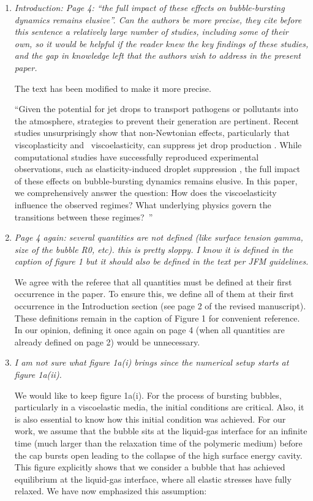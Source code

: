 \documentclass[]{article}
\newcommand{\oo}{\color{magenta} \normalfont}
\newcommand{\bb}{\color{black} \normalfont}
\begin{document}
\begin{enumerate}
      \item \textit{Introduction: Page 4: “the full impact of these effects on bubble-bursting dynamics remains elusive”. Can the authors be more precise, they cite before this sentence a relatively large number of studies, including some of their own, so it would be helpful if the reader knew the key findings of these studies, and the gap in knowledge left that the authors wish to address in the present paper.}

      The text has been modified to make it more precise.

	``Given the potential for jet drops to transport pathogens or pollutants into the atmosphere, strategies to prevent their generation are pertinent. Recent studies unsurprisingly show that non-Newtonian effects, particularly that \oo viscoplasticity and\bb\, viscoelasticity, can suppress jet drop production \citep{sanjay2021bursting, sen2021retraction, rodriguez2023bubble, ji2023secondary}.
	While computational studies have successfully reproduced experimental observations, such as elasticity-induced droplet suppression \citep{cabalganteeffect, ari2024bursting}, the full impact of these effects on bubble-bursting dynamics remains elusive. \oo In this paper, we comprehensively answer the question: How does the viscoelasticity influence the observed regimes? What underlying physics govern the transitions between these regimes?\bb\,''

      \item \textit{Page 4 again: several quantities are not defined (like surface tension gamma, size of the bubble R0, etc). this is pretty sloppy. I know it is defined in the caption of figure 1 but it should also be defined in the text per JFM guidelines.}

      We agree with the referee that all quantities must be defined at their first occurrence in the paper. To ensure this, we define all of them at their first occurrence in the Introduction section (see page 2 of the revised manuscript). These definitions remain in the caption of Figure 1 for convenient reference. In our opinion, defining it once again on page 4 (when all quantities are already defined on page 2) would be unnecessary.

      \item \textit{I am not sure what figure 1a(i) brings since the numerical setup starts at figure 1a(ii).}

      We would like to keep figure 1a(i). For the process of bursting bubbles, particularly in a viscoelastic media, the initial conditions are critical. Also, it is also essential to know how this initial condition was achieved. For our work, we assume that the bubble sits at the liquid-gas interface for an infinite time (much larger than the relaxation time of the polymeric medium) before the cap bursts open leading to the collapse of the high surface energy cavity. This figure explicitly shows that we consider a bubble that has achieved equilibrium at the liquid-gas interface, where all elastic stresses have fully relaxed. We have now emphasized this assumption:


\end{enumerate}
\end{document}
